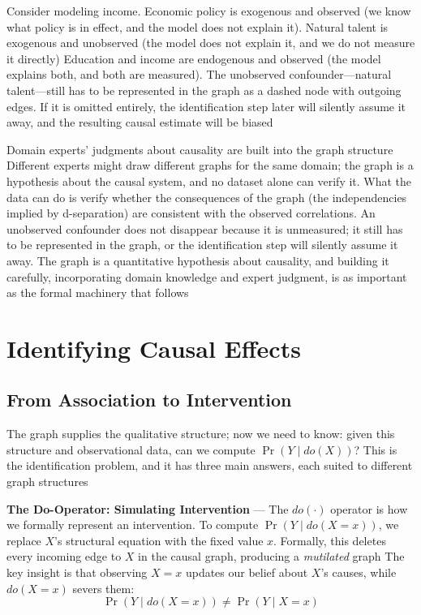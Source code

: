 Consider modeling income. Economic policy is exogenous and observed (we know
what policy is in effect, and the model does not explain it). Natural talent is exogenous
and unobserved (the model does not explain it, and we do not measure it directly)
Education and income are endogenous and observed (the model explains both, and
both are measured). The unobserved confounder—natural talent—still has to be
represented in the graph as a dashed node with outgoing edges. If it is omitted entirely,
the identification step later will silently assume it away, and the resulting causal
estimate will be biased

Domain experts' judgments about causality are built into the graph structure Different
experts might draw different graphs for the same domain; the graph is a
hypothesis about the causal system, and no dataset alone can verify it. What the
data can do is verify whether the consequences of the graph (the independencies implied
by d-separation) are consistent with the observed correlations. An unobserved confounder
does not disappear because it is unmeasured; it still has to be represented in
the graph, or the identification step will silently assume it away. The graph is
a quantitative hypothesis about causality, and building it carefully,
incorporating domain knowledge and expert judgment, is as important as the formal
machinery that follows

\section{Identifying Causal Effects}
\label{sec:identifying-causal-effects}

\subsection{From Association to Intervention}
\label{subsec:from-association-to-intervention}

The graph supplies the qualitative structure; now we need to know: given this
structure and observational data, can we compute $\Pr(Y \mid do(X))$? This is
the identification problem, and it has three main answers, each suited to
different graph structures

\textbf{The Do-Operator: Simulating Intervention} --- The $do(\cdot)$ operator
is how we formally represent an intervention. To compute $\Pr(Y \mid do(X = x))$,
we replace $X$'s structural equation with the fixed value $x$. Formally, this
deletes every incoming edge to $X$ in the causal graph, producing a \emph{mutilated}
graph The key insight is that observing $X = x$ updates our belief about $X$'s
causes, while $do(X = x)$ severs them:
\begin{equation}
  \Pr(Y \mid do(X = x)) \neq \Pr(Y \mid X = x) \label{eq:do-vs-observe}
\end{equation}

